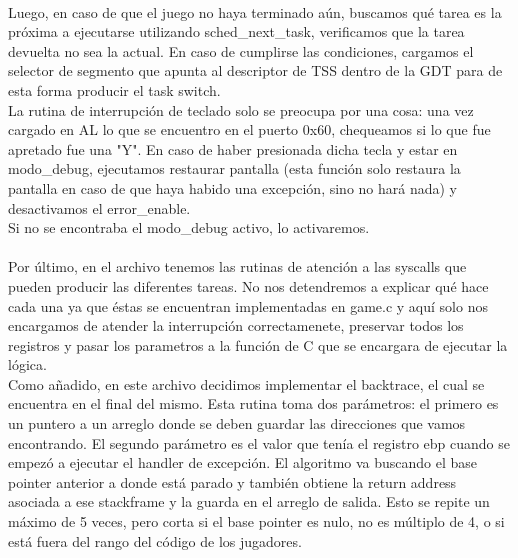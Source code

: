 \\
Luego, en caso de que el juego no haya terminado aún, buscamos qué tarea es la próxima a ejecutarse utilizando sched_next_task, verificamos que la tarea devuelta no sea la actual. En caso de cumplirse las
condiciones, cargamos el selector de segmento que apunta al descriptor de TSS dentro de la GDT para de esta forma producir el task switch.
\\
La rutina de interrupción de teclado solo se preocupa por una cosa: una vez cargado en AL lo que se encuentro en el puerto 0x60, chequeamos si lo que fue apretado fue una "Y".
En caso de haber presionada dicha tecla y estar en modo_debug, ejecutamos restaurar pantalla (esta función solo restaura la pantalla en caso de que haya habido una excepción, sino no hará nada)
y desactivamos el error_enable.
\\
Si no se encontraba el modo_debug activo, lo activaremos.
\\\\
Por último, en el archivo tenemos las rutinas de atención a las syscalls que pueden producir las diferentes tareas. No nos detendremos a explicar qué hace cada una ya que éstas
se encuentran implementadas en game.c y aquí solo nos encargamos de atender la interrupción correctamenete, preservar todos los registros y pasar los parametros a la función de C que
se encargara de ejecutar la lógica.
\\
Como añadido, en este archivo decidimos implementar el backtrace, el cual se encuentra en el final del mismo. Esta rutina toma dos parámetros: el primero es un puntero a un arreglo donde se deben guardar 
las direcciones que vamos encontrando. El segundo parámetro es el valor que tenía el registro ebp cuando se empezó a ejecutar el handler de excepción. El algoritmo va buscando el base pointer anterior a donde
está parado y también obtiene la return address asociada a ese stackframe y la guarda en el arreglo de salida. Esto se repite un máximo de 5 veces, pero corta si el base pointer es nulo, no es múltiplo de 4, o 
si está fuera del rango del código de los jugadores.